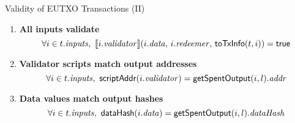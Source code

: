 \begin{frame}{Validity of EUTXO Transactions (II)}

\begin{enumerate}
\conti

\item
  \label{rule:all-inputs-validate}
  \textbf{All inputs validate}
  \begin{displaymath}
    \forall i \in t.\inputs,\ \llbracket
    i.\validator\rrbracket (i.\dataVal,\, i.\redeemerVal,\, \toPtx(t,i)) = \true
  \end{displaymath}

\item
  \label{rule:validator-scripts-hash}
  \textbf{Validator scripts match output addresses}
  \begin{displaymath}
    \forall i \in t.\mathit{inputs},\ \mathsf{scriptAddr}(i.\mathit{validator}) = \mathsf{getSpentOutput}(i, l).\mathit{addr}
  \end{displaymath}

\item
  \label{rule:data-values-hash}
  \textbf{Data values match output hashes}
  \begin{displaymath}
    \forall i \in t.\inputs,\ \hashData(i.\dataVal) = \getSpent(i, l).\dataHsh
  \end{displaymath}
\end{enumerate}

\end{frame}
